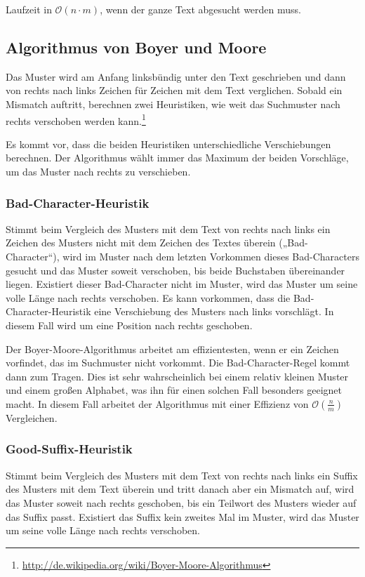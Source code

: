Laufzeit in \(\mathcal{O}(n\cdot m)\), wenn der ganze Text abgesucht werden muss.

\subsection{Algorithmus von Boyer und Moore}
Das Muster wird am Anfang linksbündig unter den Text geschrieben und dann von rechts nach links Zeichen für Zeichen mit dem Text verglichen. Sobald ein Mismatch auftritt, berechnen zwei Heuristiken, wie weit das Suchmuster nach rechts verschoben werden kann.\footnote{\url{http://de.wikipedia.org/wiki/Boyer-Moore-Algorithmus}}

Es kommt vor, dass die beiden Heuristiken unterschiedliche Verschiebungen berechnen. Der Algorithmus wählt immer das Maximum der beiden Vorschläge, um das Muster nach rechts zu verschieben.

\subsubsection{Bad-Character-Heuristik}
Stimmt beim Vergleich des Musters mit dem Text von rechts nach links ein Zeichen des Musters nicht mit dem Zeichen des Textes überein („Bad-Character“), wird im Muster nach dem letzten Vorkommen dieses Bad-Characters gesucht und das Muster soweit verschoben, bis beide Buchstaben übereinander liegen. Existiert dieser Bad-Character nicht im Muster, wird das Muster um seine volle Länge nach rechts verschoben. Es kann vorkommen, dass die Bad-Character-Heuristik eine Verschiebung des Musters nach links vorschlägt. In diesem Fall wird um eine Position nach rechts geschoben.

Der Boyer-Moore-Algorithmus arbeitet am effizientesten, wenn er ein Zeichen vorfindet, das im Suchmuster nicht vorkommt. Die Bad-Character-Regel kommt dann zum Tragen. Dies ist sehr wahrscheinlich bei einem relativ kleinen Muster und einem großen Alphabet, was ihn für einen solchen Fall besonders geeignet macht. In diesem Fall arbeitet der Algorithmus mit einer Effizienz von \(\mathcal{O}(\frac{n}{m})\) Vergleichen.

\subsubsection{Good-Suffix-Heuristik}
Stimmt beim Vergleich des Musters mit dem Text von rechts nach links ein Suffix des Musters mit dem Text überein und tritt danach aber ein Mismatch auf, wird das Muster soweit nach rechts geschoben, bis ein Teilwort des Musters wieder auf das Suffix passt. Existiert das Suffix kein zweites Mal im Muster, wird das Muster um seine volle Länge nach rechts verschoben.

